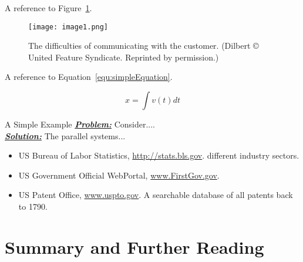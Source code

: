 \lipsum[9]
A reference to Figure~\ref{figure:dilbertCommunication}.
\lipsum[10]

\begin{figure}[h]
\texttt{[image: image1.png]}
\caption{ The difficulties of communicating with the customer. (Dilbert © United Feature Syndicate. Reprinted by
permission.)}
\label{figure:dilbertCommunication}
\end{figure}


\lipsum[11]
A reference to Equation~\ref{equ:simpleEquation}.
\lipsum[12]


\begin{equation}
\label{equ:simpleEquation}
x = \int v(t) dt
\end{equation}

\lipsum[12]

\begin{example}{A Simple Example}
\label{example:aSimpleExample}
\emph{\textbf{\ul{Problem:}}} Consider.... \\	%
\noindent\emph{\textbf{\ul{Solution:}}} The parallel systems...
\end{example}

\lipsum[13]

\begin{itemize}
\item
  US Bureau of Labor Statistics, \url{http://stats.bls.gov}.
  different industry sectors.
\item
  US Government Official WebPortal,  \href{http://www.FirstGov.gov}{www.FirstGov.gov}. 
\item
  US Patent Office, \href{http://www.uspto.gov}{www.uspto.gov}. A
  searchable database of all patents back to 1790. 
\end{itemize}



\section{Summary and Further Reading}
\label{section:summary-and-further-reading}

\lipsum[30-31]
